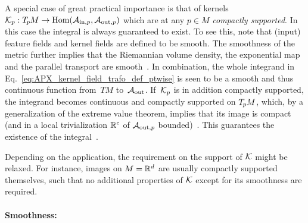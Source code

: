A special case of great practical importance is that of kernels $\mathcal{K}_p: T_{\mkern-1.5mu p}\mkern-.5muM \to \operatorname{Hom}(\mathcal{A}_{\textup{in},p},\mathcal{A}_{\textup{out},p})$ which are at any $p\in M$ \emph{compactly supported}.
In this case the integral is always guaranteed to exist.
To see this, note that (input) feature fields and kernel fields are defined to be smooth.
The smoothness of the metric further implies that the
Riemannian volume density, the exponential map and the parallel transport are smooth~\cite{gallier2019diffgeom1}.
In combination, the whole integrand in Eq.~\eqref{eq:APX_kernel_field_trafo_def_ptwise} is seen to be a smooth and thus continuous function from~$TM$ to~$\mathcal{A}_\textup{out}$.
If~$\mathcal{K}_p$ is in addition compactly supported, the integrand becomes continuous and compactly supported on $T_{\mkern-1.5mu p}\mkern-.5muM$, which, by a generalization of the extreme value theorem, implies that its image is compact (and in a local trivialization $\mathbb{R}^{c}$ of $\mathcal{A}_{\textup{out},p}$ bounded)~\cite{rudin1976analysis}.
This guarantees the existence of the integral~\cite{forster2012analysis3,spivak2019calculus}.


Depending on the application, the requirement on the support of $\mathcal{K}$ might be relaxed.
For instance, images on $M=\mathbb{R}^d$ are usually compactly supported themselves, such that no additional properties of $\mathcal{K}$ except for its smoothness are required.







\paragraph{Smoothness:}

